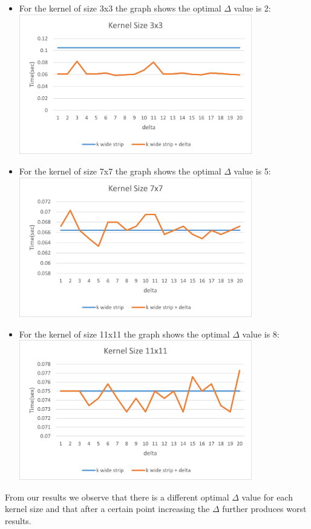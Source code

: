 \documentclass{article}
\begin{document}
\begin{enumerate} [label = \Alph*]
  \begin{itemize}
    \item For the kernel of size 3x3 the graph shows the optimal $\Delta$ value is 2: \\
    \includegraphics[width=0.8\textwidth]{Problem15_3.png}
    \item For the kernel of size 7x7 the graph shows the optimal $\Delta$ value is 5: \\
    \includegraphics[width=0.8\textwidth]{Problem15_7.png}
    \item For the kernel of size 11x11 the graph shows the optimal $\Delta$ value is 8: \\
    \includegraphics[width=0.8\textwidth]{Problem15_11.png}
  \end{itemize}
  From our results we observe that there is a different optimal $\Delta$ value for each kernel size and that after a certain point 
  increasing the $\Delta$ further produces worst results.
\end{enumerate}
\end{document}
